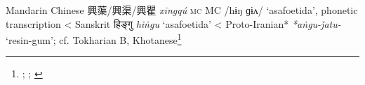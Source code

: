 \begin{etymology}\label{ety:xingqu}
Mandarin Chinese {興蕖/興渠/興瞿} \textit{xīngqú} \textsc{mc} MC /hɨŋ ɡɨʌ/ `asafoetida', phonetic transcription
< Sanskrit {हिङ्गु} \textit{hiṅgu} `asafoetida'
< Proto-Iranian* \textit{*aṅgu-ǰatu-} `resin-gum'; cf. Tokharian B, Khotanese\footnote{\textcite{leung_itinerary_2019}; \textcite[353]{laufer_sino-iranica_1919}; \textcite[7]{adams_dictionary_2013}}
\end{etymology}